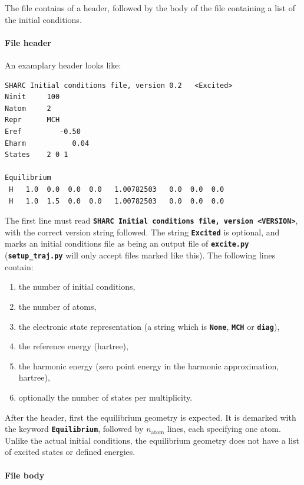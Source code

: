 \documentclass[a4paper,10pt,DIV=15,openany]{scrbook}
\newcommand{\ttt}[1]{\textbf{\texttt{#1}}}
\newenvironment{example}{
  \setlength{\OuterFrameSep}{3pt}
  \vspace{0mm}
  \definecolor{shadecolor}{HTML}{E4F4FF}
  \begin{shaded}
}{
  \end{shaded}
}
\begin{document}
The file contains of a header, followed by the body of the file containing a list of the initial conditions. 

\paragraph{File header}

An examplary header looks like:
\begin{example}
\footnotesize\begin{verbatim}
SHARC Initial conditions file, version 0.2   <Excited>
Ninit     100
Natom     2
Repr      MCH
Eref         -0.50
Eharm           0.04
States    2 0 1 

Equilibrium
 H   1.0  0.0  0.0  0.0   1.00782503   0.0  0.0  0.0
 H   1.0  1.5  0.0  0.0   1.00782503   0.0  0.0  0.0
\end{verbatim}
\end{example}
The first line must read \ttt{SHARC Initial conditions file, version <VERSION>}, with the correct version string followed. The string \ttt{Excited} is optional, and marks an initial conditions file as being an output file of \ttt{excite.py} (\ttt{setup\_traj.py} will only accept files marked like this). The following lines contain:
\begin{enumerate}
  \item the number of initial conditions, 
  \item the number of atoms,
  \item the electronic state representation (a string which is \ttt{None}, \ttt{MCH} or \ttt{diag}),
  \item the reference energy (hartree),
  \item the harmonic energy (zero point energy in the harmonic approximation, hartree),
  \item optionally the number of states per multiplicity.
\end{enumerate}

After the header, first the equilibrium geometry is expected. It is demarked with the keyword \ttt{Equilibrium}, followed by $n_\text{atom}$ lines, each specifying one atom. Unlike the actual initial conditions, the equilibrium geometry does not have a list of excited states or defined energies.

\paragraph{File body}
\end{document}
